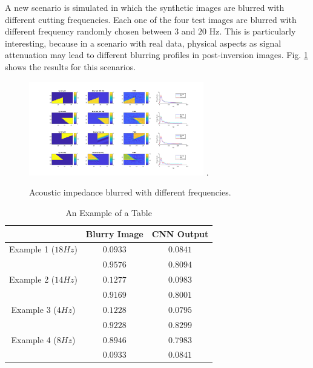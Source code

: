 \documentclass[conference,compsoc]{IEEEtran}
\begin{document}
A new scenario is simulated in which the synthetic images are blurred with different
cutting frequencies. Each one of the four test images are blurred with different frequency
randomly chosen between $3$ and $20$ Hz. This is particularly interesting, because
in a scenario with real data, physical aspects as signal attenuation may lead to
different blurring profiles in post-inversion images.
Fig. \ref{fig_scenario5} shows the results for this scenarios.
\begin{figure}[!t]
\centering
\includegraphics[width=3.0in]{Figs/Caso5}
\DeclareGraphicsExtensions.
\caption{Acoustic impedance blurred with different frequencies.}
\label{fig_scenario5}
\end{figure}

\begin{table}[!t]
\renewcommand{\arraystretch}{1.3}
\caption{An Example of a Table}
\label{table_caso_5}
\centering
\begin{tabular}{|c||c||c|}
\hline
 & Blurry Image & CNN Output \\
\hline
Example 1 ($18Hz$) & $0.0933$ & $0.0841$\\
\hline
	  & $0.9576$ & $0.8094$\\
\hline
Example 2 ($14Hz$)& $0.1277$ & $0.0983$ \\
\hline
	  & $0.9169$ & $0.8001$\\
\hline
Example 3 ($4Hz$)& $0.1228$ & $0.0795$\\
\hline
	  & $0.9228$ & $0.8299$\\
\hline
Example 4 ($8Hz$)& $0.8946$ & $0.7983$\\
\hline
  & $0.0933$ & $0.0841$\\
\hline
\end{tabular}
\end{table}
\end{document}
